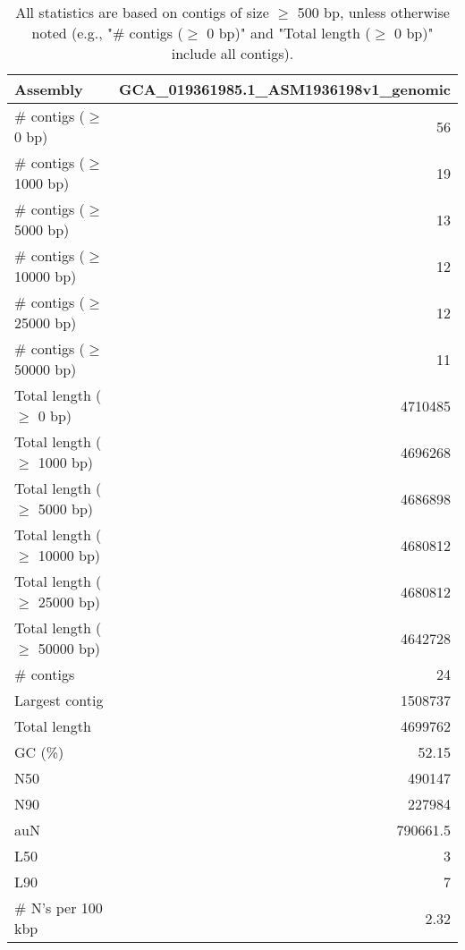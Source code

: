 \documentclass[12pt,a4paper]{article}
\begin{document}
\begin{table}[ht]
\begin{center}
\caption{All statistics are based on contigs of size $\geq$ 500 bp, unless otherwise noted (e.g., "\# contigs ($\geq$ 0 bp)" and "Total length ($\geq$ 0 bp)" include all contigs).}
\begin{tabular}{|l*{1}{|r}|}
\hline
Assembly & GCA\_019361985.1\_ASM1936198v1\_genomic \\ \hline
\# contigs ($\geq$ 0 bp) & 56 \\ \hline
\# contigs ($\geq$ 1000 bp) & 19 \\ \hline
\# contigs ($\geq$ 5000 bp) & 13 \\ \hline
\# contigs ($\geq$ 10000 bp) & 12 \\ \hline
\# contigs ($\geq$ 25000 bp) & 12 \\ \hline
\# contigs ($\geq$ 50000 bp) & 11 \\ \hline
Total length ($\geq$ 0 bp) & 4710485 \\ \hline
Total length ($\geq$ 1000 bp) & 4696268 \\ \hline
Total length ($\geq$ 5000 bp) & 4686898 \\ \hline
Total length ($\geq$ 10000 bp) & 4680812 \\ \hline
Total length ($\geq$ 25000 bp) & 4680812 \\ \hline
Total length ($\geq$ 50000 bp) & 4642728 \\ \hline
\# contigs & 24 \\ \hline
Largest contig & 1508737 \\ \hline
Total length & 4699762 \\ \hline
GC (\%) & 52.15 \\ \hline
N50 & 490147 \\ \hline
N90 & 227984 \\ \hline
auN & 790661.5 \\ \hline
L50 & 3 \\ \hline
L90 & 7 \\ \hline
\# N's per 100 kbp & 2.32 \\ \hline
\end{tabular}
\end{center}
\end{table}
\end{document}
